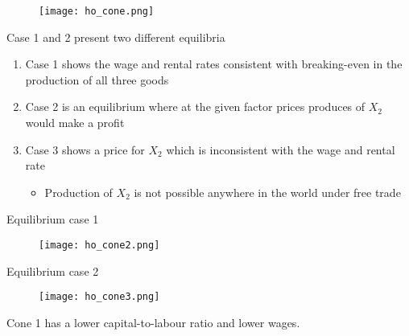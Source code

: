 \documentclass{beamer}
\begin{document}
\begin{frame}
  \begin{figure}
    \texttt{[image: ho\_cone.png]}
  \end{figure}
\end{frame}

\begin{frame}
 Case 1 and 2 present two different equilibria
 \begin{enumerate}
   \item Case 1 shows the wage and rental rates consistent with breaking-even in the production of all three goods
   \item Case 2 is an equilibrium where at the given factor prices produces of $X_2$ would make a profit
   \medskip
   \item Case 3 shows a price for $X_2$ which is inconsistent with the wage and rental rate
   \begin{itemize}
      \item Production of $X_2$ is not possible anywhere in the world under free trade
    \end{itemize} 
 \end{enumerate}
\end{frame}

\begin{frame}{Equilibrium case 1}
  \begin{figure}
    \texttt{[image: ho\_cone2.png]}
  \end{figure}  
\end{frame}

\begin{frame}{Equilibrium case 2}
  \begin{figure}
    \texttt{[image: ho\_cone3.png]}
  \end{figure}
  Cone 1 has a lower capital-to-labour ratio and lower wages.
\end{frame}
\end{document}
